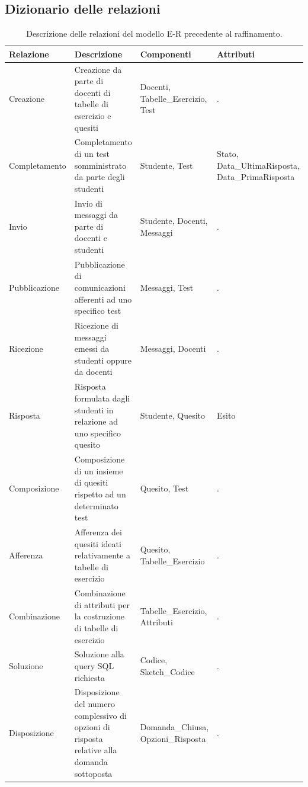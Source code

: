 \documentclass{article}
\begin{document}
\subsection{Dizionario delle relazioni}
\large
\begin{table}[H]
    \centering
    \begin{tabularx}{\textwidth}{|X|p{5cm}|p{3cm}|X|}
        \hline
        \bf Relazione & \bf Descrizione & \bf Componenti & \bf Attributi \\
        \hline
        Creazione & Creazione da parte di docenti di tabelle di esercizio e quesiti & Docenti, Tabelle\_Esercizio, Test & . \\
        \hline
        Completamento & Completamento di un test somministrato da parte degli studenti & Studente, Test & Stato, Data\_UltimaRisposta, Data\_PrimaRisposta \\
        \hline
        Invio & Invio di messaggi da parte di docenti e studenti & Studente, Docenti, Messaggi & . \\
        \hline 
        Pubblicazione & Pubblicazione di comunicazioni afferenti ad uno specifico test & Messaggi, Test & . \\
        \hline
        Ricezione & Ricezione di messaggi emessi da studenti oppure da docenti & Messaggi, Docenti & . \\
        \hline
        Risposta & Risposta formulata dagli studenti in relazione ad uno specifico quesito & Studente, Quesito & Esito \\
        \hline
        Composizione & Composizione di un insieme di quesiti rispetto ad un determinato test & Quesito, Test & . \\
        \hline
        Afferenza & Afferenza dei quesiti ideati relativamente a tabelle di esercizio & Quesito, Tabelle\_Esercizio & . \\
        \hline
        Combinazione & Combinazione di attributi per la costruzione di tabelle di esercizio & Tabelle\_Esercizio, Attributi & . \\
        \hline
        Soluzione & Soluzione alla query SQL richiesta & Codice, Sketch\_Codice & . \\
        \hline
        Disposizione & Disposizione del numero complessivo di opzioni di risposta relative alla domanda sottoposta & Domanda\_Chiusa, Opzioni\_Risposta & . \\    
        \hline
    \end{tabularx}
    \caption{Descrizione delle relazioni del modello E-R precedente al raffinamento.}
\end{table}
\end{document}
